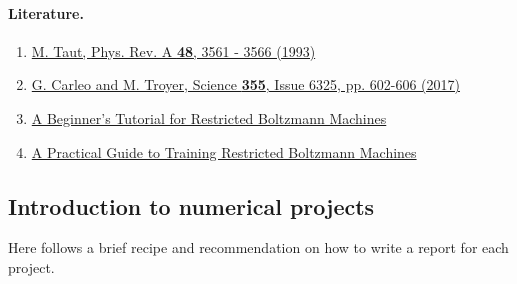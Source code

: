\documentclass[%
oneside,                 %
final,                   %
10pt]{article}
\begin{document}
\paragraph{Literature.}
\begin{enumerate}
 \item \href{{https://journals.aps.org/pra/abstract/10.1103/PhysRevA.48.3561}}{M. Taut, Phys. Rev. A \textbf{48}, 3561 - 3566 (1993)}

 \item \href{{http://science.sciencemag.org/content/355/6325/602}}{G. Carleo and M. Troyer, Science \textbf{355}, Issue 6325, pp. 602-606 (2017)}

 \item \href{{https://deeplearning4j.org/restrictedboltzmannmachine}}{A Beginner’s Tutorial for Restricted Boltzmann Machines}

 \item \href{{https://www.cs.toronto.edu/~hinton/absps/guideTR.pdf}}{A Practical Guide to Training Restricted Boltzmann Machines}
\end{enumerate}

\noindent
\subsection{Introduction to numerical projects}

Here follows a brief recipe and recommendation on how to write a report for each
project.
\end{document}
